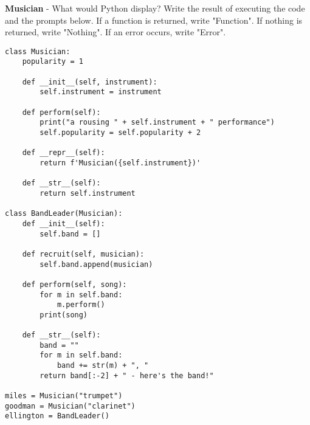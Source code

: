 \begin{blocksection}
\question \textbf{Musician} - What would Python display? Write the result of executing the code and the prompts below. If a function is returned, write "Function". If nothing is returned, write "Nothing". If an error occurs, write "Error".

\begin{lstlisting}
class Musician:
    popularity = 1
    
    def __init__(self, instrument):
        self.instrument = instrument 
    
    def perform(self):
        print("a rousing " + self.instrument + " performance")
        self.popularity = self.popularity + 2 
        
    def __repr__(self):
        return f'Musician({self.instrument})'
    
    def __str__(self):
        return self.instrument
        
class BandLeader(Musician): 
    def __init__(self):
        self.band = []
        
    def recruit(self, musician):
        self.band.append(musician) 
    
    def perform(self, song):
        for m in self.band: 
            m.perform()
        print(song) 
        
    def __str__(self):
        band = ""
        for m in self.band:
            band += str(m) + ", " 
        return band[:-2] + " - here's the band!" 

miles = Musician("trumpet")
goodman = Musician("clarinet")
ellington = BandLeader()
\end{lstlisting}
\end{blocksection}

\newpage

